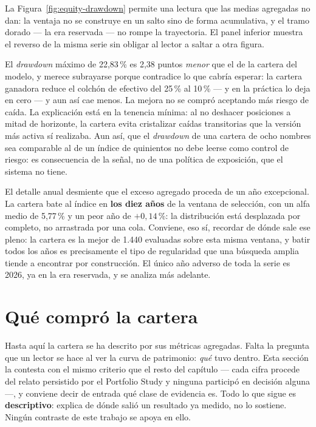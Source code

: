 La Figura~\ref{fig:equity-drawdown} permite una lectura que las medias agregadas no dan: la
ventaja no se construye en un salto sino de forma acumulativa, y el tramo dorado --- la era
reservada --- no rompe la trayectoria. El panel inferior muestra el reverso de la misma serie sin
obligar al lector a saltar a otra figura.

El \textit{drawdown} máximo de 22,83\,\% es 2,38 puntos \emph{menor} que el de la cartera del
modelo, y merece subrayarse porque contradice lo que cabría esperar: la cartera ganadora reduce el
colchón de efectivo del 25\,\% al 10\,\% --- y en la práctica lo deja en cero --- y aun así cae
menos. La mejora no se compró aceptando más riesgo de caída. La explicación está en la tenencia
mínima: al no deshacer posiciones a mitad de horizonte, la cartera evita cristalizar caídas
transitorias que la versión más activa sí realizaba. Aun así, que el \textit{drawdown} de una
cartera de ocho nombres sea comparable al de un índice de quinientos no debe leerse como control de
riesgo: es consecuencia de la señal, no de una política de exposición, que el sistema no tiene.


\begin{table}[H]
  \centering
  \scriptsize
  \caption{Resultado anual de la cartera ganadora.}
  \label{tab:anual}
  
  \caption*{Turnover anualizado; efectivo medio.}
\end{table}

El detalle anual desmiente que el exceso agregado proceda de un año excepcional. La cartera bate al
índice en \textbf{los diez años} de la ventana de selección, con un alfa medio de 5,77\,\% y un peor
año de $+0{,}14$\,\%: la distribución está desplazada por completo, no arrastrada por una cola.
Conviene, eso sí, recordar de dónde sale ese pleno: la cartera es la mejor de 1.440 evaluadas sobre
esta misma ventana, y batir todos los años es precisamente el tipo de regularidad que una búsqueda
amplia tiende a encontrar por construcción. El único año adverso de toda la serie es 2026, ya en la
era reservada, y se analiza más adelante.

\section{Qué compró la cartera}
\label{sec:relato-cartera}

Hasta aquí la cartera se ha descrito por sus métricas agregadas. Falta la pregunta que un lector se
hace al ver la curva de patrimonio: \emph{qué} tuvo dentro. Esta sección la contesta con el mismo
criterio que el resto del capítulo --- cada cifra procede del relato persistido por el Portfolio
Study y ninguna participó en decisión alguna ---, y conviene decir de entrada qué clase de evidencia
es. Todo lo que sigue es \textbf{descriptivo}: explica de dónde salió un resultado ya medido, no lo
sostiene. Ningún contraste de este trabajo se apoya en ello.

